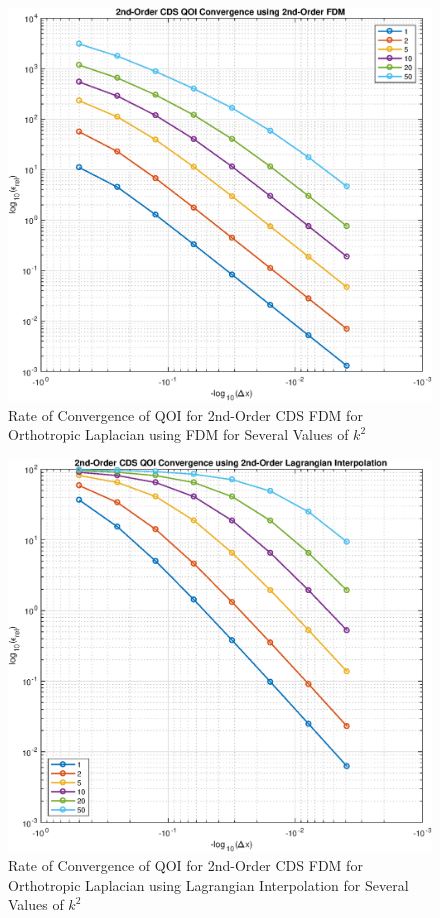 \documentclass[10pt]{article}		%
\numberwithin{equation}{section}
\begin{document}
\begin{figure}[H]
	\begin{center}
		\includegraphics[width = 0.8\linewidth]{order_2_u_y_fdm}
		\caption{Rate of Convergence of QOI for 2nd-Order CDS FDM for Orthotropic Laplacian using FDM for Several Values of $k^2$}	
	\end{center}
\end{figure}

\begin{table}[H]
	
\end{table}

\begin{figure}[H]
	\begin{center}
		\includegraphics[width = 0.8\linewidth]{order_2_u_y_lag}
		\caption{Rate of Convergence of QOI for 2nd-Order CDS FDM for Orthotropic Laplacian using Lagrangian Interpolation for Several Values of $k^2$}	
	\end{center}
\end{figure}
\end{document}
